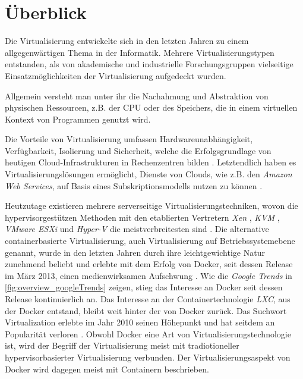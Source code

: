\documentclass[../main.tex]{subfiles}
\begin{document}
\chapter{Überblick}
\label{overview}
  Die Virtualisierung entwickelte sich in den letzten Jahren zu einem allgegenwärtigen Thema in der Informatik. Mehrere Virtualisierungstypen entstanden, als von akademische und industrielle Forschungsgruppen vielseitige Einsatzmöglichkeiten der Virtualisierung aufgedeckt wurden.

  Allgemein versteht man unter ihr die Nachahmung und Abstraktion von physischen Ressourcen, z.B. der \acrshort{CPU} oder des Speichers, die in einem virtuellen Kontext von Programmen genutzt wird.

  Die Vorteile von Virtualisierung umfassen Hardwareunabhängigkeit, Verfügbarkeit, Isolierung und Sicherheit, welche die Erfolgsgrundlage von heutigen \gls{Cloud}-Infrastrukturen in Rechenzentren bilden \cite[S.1]{containerVirtPerformance}.
  Letztendlich haben es Virtualisierungslösungen ermöglicht, Dienste von Clouds, wie z.B. den \emph{Amazon Web Services}\cite{amazonWebServices}, auf Basis eines Subskriptionsmodells nutzen zu können \cite[S.1]{dockerSec1}.

  Heutzutage existieren mehrere serverseitige Virtualisierungstechniken, wovon die hypervisorgestützen Methoden mit den etablierten Vertretern \emph{Xen} \cite{xen}, \emph{KVM} \cite{kvm}, \emph{VMware ESXi} \cite{vmwareESXi} und \emph{Hyper-V} \cite{hyperv} die meistverbreitesten sind \cite[S.2]{containerVirtPerformance}. Die alternative containerbasierte Virtualisierung, auch Virtualisierung auf Betriebssystemebene genannt, wurde in den letzten Jahren durch ihre leichtgewichtige Natur zunehmend beliebt und erlebte mit dem Erfolg von Docker, seit dessen Release im März 2013, einen medienwirksamen Aufschwung \cite{githubDockerChangelog}. Wie die \emph{Google Trends} in \fig \ref{fig:overview_googleTrends} zeigen, stieg das Interesse an Docker seit dessen Release kontinuierlich an. Das Interesse an der Containertechnologie \emph{LXC}, aus der Docker entstand, bleibt weit hinter der von Docker zurück. Das Suchwort \glqq{}Virtualization\grqq{} erlebte im Jahr 2010 seinen Höhepunkt und hat seitdem an Popularität verloren \cite{googleTrends}. Obwohl Docker eine Art von  Virtualisierungstechnologie ist, wird der Begriff der Virtualisierung meist mit tradiotioneller hypervisorbasierter Virtualisierung verbunden. Der Virtualisierungsaspekt von Docker wird dagegen meist mit Containern beschrieben.
\end{document}
